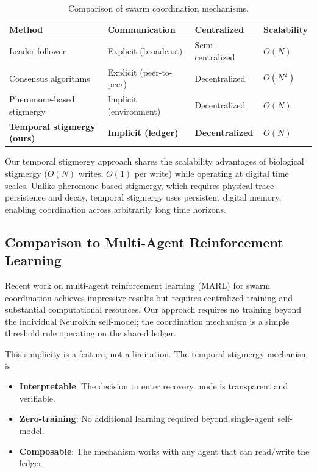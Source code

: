 \documentclass[12pt,a4paper,oneside]{report}
\begin{document}
\begin{table}[H]
\centering
\small
\setlength{\tabcolsep}{4pt}
\caption{Comparison of swarm coordination mechanisms.}
\label{tab:swarm_comparison_lit}
\begin{tabular}{>{\raggedright\arraybackslash}p{4.0cm} >{\raggedright\arraybackslash}p{4.0cm} >{\centering\arraybackslash}p{2.6cm} >{\centering\arraybackslash}p{2.6cm}}
\toprule
\textbf{Method} & \textbf{Communication} & \textbf{Centralized} & \textbf{Scalability} \\
\midrule
Leader-follower & Explicit (broadcast) & Semi-centralized & $O(N)$ \\
Consensus algorithms & Explicit (peer-to-peer) & Decentralized & $O(N^2)$ \\
Pheromone-based stigmergy & Implicit (environment) & Decentralized & $O(N)$ \\
\textbf{Temporal stigmergy (ours)} & \textbf{Implicit (ledger)} & \textbf{Decentralized} & \textbf{$O(N)$} \\
\bottomrule
\end{tabular}
\end{table}

Our temporal stigmergy approach shares the scalability advantages of biological stigmergy ($O(N)$ writes, $O(1)$ per write) while operating at digital time scales. Unlike pheromone-based stigmergy, which requires physical trace persistence and decay, temporal stigmergy uses persistent digital memory, enabling coordination across arbitrarily long time horizons.

\subsection{Comparison to Multi-Agent Reinforcement Learning}
\label{subsec:comparison_to_multi_agent_reinforcement_learning}

Recent work on multi-agent reinforcement learning (MARL) for swarm coordination \cite{domberg2026selfadapting, daneshmand2026slowrl} achieves impressive results but requires centralized training and substantial computational resources. Our approach requires no training beyond the individual NeuroKin self-model; the coordination mechanism is a simple threshold rule operating on the shared ledger.

This simplicity is a feature, not a limitation. The temporal stigmergy mechanism is:
\begin{itemize}
    \item \textbf{Interpretable}: The decision to enter recovery mode is transparent and verifiable.
    \item \textbf{Zero-training}: No additional learning required beyond single-agent self-model.
    \item \textbf{Composable}: The mechanism works with any agent that can read/write the ledger.
\end{itemize}
\end{document}
